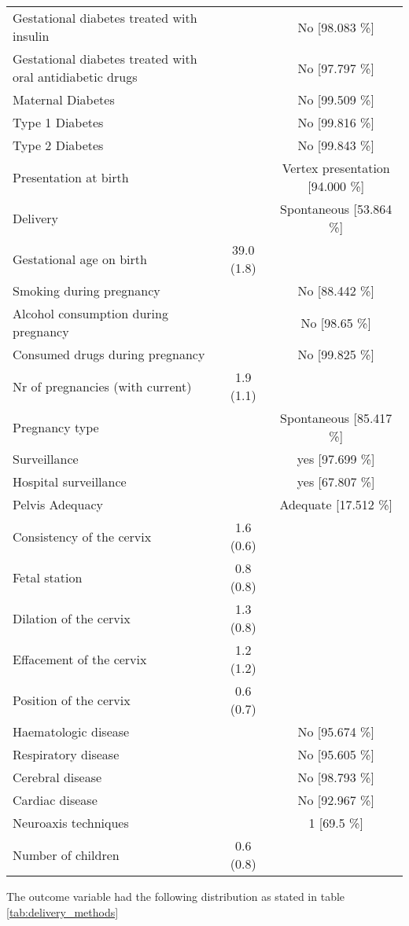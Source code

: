 \begin{table}[htbp]
\begin{tabular}{m{15em}cc}
        Gestational diabetes treated with insulin & ~ & No [98.083 \%] \\ 
        Gestational diabetes treated with oral antidiabetic drugs & ~ & No [97.797 \%] \\ 
        Maternal Diabetes & ~ & No [99.509 \%] \\ 
        Type 1 Diabetes & ~ & No [99.816 \%] \\ 
        Type 2 Diabetes & ~ & No [99.843 \%] \\ 
        Presentation at birth & ~ & Vertex presentation [94.000 \%] \\ 
        Delivery & ~ & Spontaneous [53.864 \%] \\ 
        Gestational age on birth & 39.0 (1.8) & ~ \\ 
        Smoking during pregnancy & ~ & No [88.442 \%] \\ 
        Alcohol consumption during pregnancy & ~ & No [98.65 \%] \\ 
        Consumed drugs during pregnancy & ~ & No [99.825 \%] \\ 
        Nr of pregnancies (with current) & 1.9 (1.1) & ~ \\ 
        Pregnancy type & ~ & Spontaneous [85.417 \%] \\ 
        Surveillance & ~ & yes [97.699 \%] \\ 
        Hospital surveillance & ~ & yes [67.807 \%] \\ 
        Pelvis Adequacy & ~ & Adequate [17.512 \%] \\ 
        Consistency of the cervix & 1.6 (0.6) & ~ \\ 
        Fetal station & 0.8 (0.8) & ~ \\ 
        Dilation of the cervix & 1.3 (0.8) & ~ \\ 
        Effacement of the cervix & 1.2 (1.2) & ~ \\ 
        Position of the cervix & 0.6 (0.7) & ~ \\ 
        Haematologic disease & ~ & No [95.674 \%] \\ 
        Respiratory disease & ~ & No [95.605 \%] \\ 
        Cerebral disease & ~ & No [98.793 \%] \\ 
        Cardiac disease & ~ & No [92.967 \%] \\ 
        Neuroaxis techniques & ~ & 1 [69.5 \%] \\ 
        Number of children  & 0.6 (0.8)  & ~\\ 
        \bottomrule
    \end{tabular}


\end{table}
The outcome variable had the following distribution as stated in table \ref{tab:delivery_methods}

